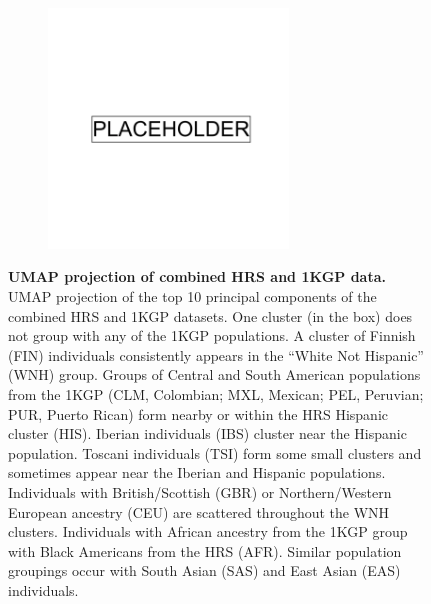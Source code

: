 \begin{figure}
    \centering
    \begin{subfigure}{\textwidth}
    \includegraphics[width=0.7\textwidth]{placeholder.png}
    \end{subfigure}
    \caption[UMAP projection of combined HRS and 1KGP data]{\textbf{UMAP projection of combined HRS and 1KGP data.} UMAP projection of the top 10 principal components of the combined HRS and 1KGP datasets. One cluster (in the box) does not group with any of the 1KGP populations. A cluster of Finnish (FIN) individuals consistently appears in the ``White Not Hispanic'' (WNH) group. Groups of Central and South American populations from the 1KGP (CLM, Colombian; MXL, Mexican; PEL, Peruvian; PUR, Puerto Rican) form nearby or within the HRS Hispanic cluster (HIS). Iberian individuals (IBS) cluster near the Hispanic population. Toscani individuals (TSI) form some small clusters and sometimes appear near the Iberian and Hispanic populations. Individuals with British/Scottish (GBR) or Northern/Western European ancestry (CEU) are scattered throughout the WNH clusters. Individuals with African ancestry from the 1KGP group with Black Americans from the HRS (AFR). Similar population groupings occur with South Asian (SAS) and East Asian (EAS) individuals.}
    \label{fig:supp_hrs_1000g}
\end{figure}

\newpage

